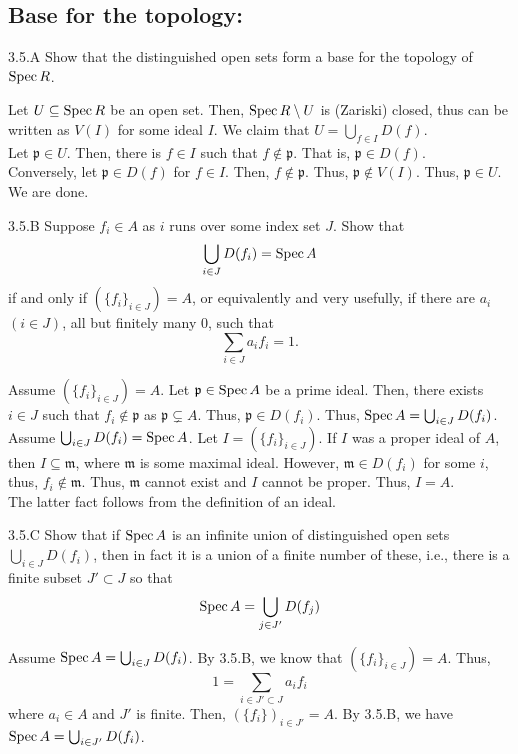 \subsection{Base for the topology:}
\begin{exercise}{3.5.A}
    Show that the distinguished open sets form a base for the topology of $\operatorname{Spec} R$. 
\end{exercise}
\begin{solution}
    Let $U \subseteq \operatorname{Spec} R$ be an open set. Then, $\operatorname{Spec} R \setminus U$ is (Zariski) closed, thus can be written as $V(I)$ for some ideal $I$. We claim that $U = \bigcup_{f \in I} D(f)$. \\
    Let $\mathfrak p \in U$. Then, there is $f \in I$ such that $f \not \in \mathfrak p$. That is, $\mathfrak p \in D(f)$. \\
    Conversely, let $\mathfrak p \in D(f)$ for $f \in I$. Then, $f \not \in \mathfrak p$. Thus, $\mathfrak p \not \in V(I)$. Thus, $\mathfrak p \in U$. \\
    We are done. 
\end{solution}

\begin{exercise}{3.5.B}
Suppose $f_i \in A$ as $i$ runs over some index set $J$.
Show that
\[ \bigcup_{i \in J} D(f_i) = \operatorname{Spec} A \]
if and only if $(\{f_i\}_{i \in J}) = A$, or equivalently and very usefully,
if there are $a_i$ $(i \in J)$, all but finitely many $0$, such that
\[ \sum_{i \in J} a_i f_i = 1. \]
\end{exercise}
\begin{solution}
    Assume $(\{f_i\}_{i \in J}) = A$. Let $\mathfrak p \in \operatorname{Spec} A$ be a prime ideal. Then, there exists $i \in J$ such that $f_i \not \in \mathfrak p$ as $\mathfrak p \subsetneq A$. Thus, $\mathfrak p \in D(f_i)$. Thus, $\operatorname{Spec} A = \bigcup_{i \in J} D(f_i)$. \\
    Assume $\bigcup_{i \in J} D(f_i) = \operatorname{Spec} A$. Let $I = (\{f_i\}_{i \in J})$. If $I$ was a proper ideal of $A$, then $I \subseteq \mathfrak m$, where $\mathfrak m$ is some maximal ideal. However, $\mathfrak m \in D(f_i)$ for some $i$, thus, $f_i \not \in \mathfrak m$. Thus, $\mathfrak m$ cannot exist and $I$ cannot be proper. Thus, $I = A$. \\
    The latter fact follows from the definition of an ideal. 
\end{solution}

\begin{exercise}{3.5.C}
Show that if $\operatorname{Spec} A$ is an infinite union of distinguished open sets
$\bigcup_{i \in J} D(f_i)$, then in fact it is a union of a finite number
of these, i.e., there is a finite subset $J' \subset J$ so that
\[ \operatorname{Spec} A = \bigcup_{j \in J'} D(f_j) \]
\end{exercise}
\begin{solution}
    Assume $\operatorname{Spec} A = \bigcup_{i \in J} D(f_i)$. By 3.5.B, we know that $(\{f_i\}_{i \in J}) = A$. Thus, 
    \[ 1 = \sum_{i \in J' \subset J} a_if_i\]
    where $a_i \in A$ and $J'$ is finite. Then, $(\{f_i\})_{i \in J'} = A$. By 3.5.B, we have $\operatorname{Spec} A = \bigcup_{i \in J'} D(f_i)$. 
\end{solution}

